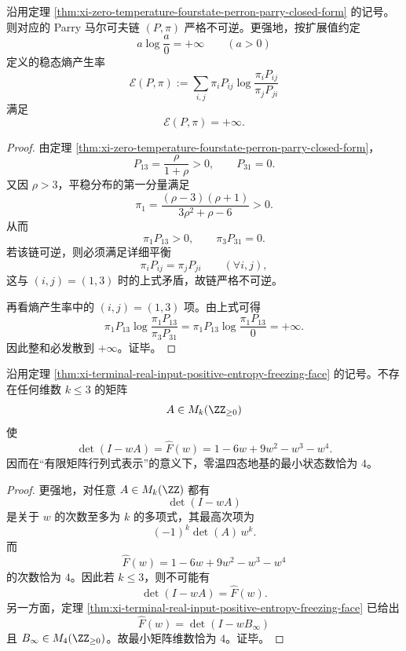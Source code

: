 \begin{theorem}\label{thm:xi-zero-temperature-parry-irreversible-infinite-entropy-production}
沿用定理 \ref{thm:xi-zero-temperature-fourstate-perron-parry-closed-form} 的记号。则对应的 Parry 马尔可夫链 \((P,\pi)\) 严格不可逆。更强地，按扩展值约定
\[
a\log\frac{a}{0}=+\infty
\qquad(a>0)
\]
定义的稳态熵产生率
\[
\mathcal E(P,\pi)
:=
\sum_{i,j}\pi_iP_{ij}\log\frac{\pi_iP_{ij}}{\pi_jP_{ji}}
\]
满足
\[
\mathcal E(P,\pi)=+\infty.
\]
\end{theorem}
\begin{proof}
由定理 \ref{thm:xi-zero-temperature-fourstate-perron-parry-closed-form}，
\[
P_{13}=\frac{\rho}{1+\rho}>0,
\qquad
P_{31}=0.
\]
又因 \(\rho>3\)，平稳分布的第一分量满足
\[
\pi_1=\frac{(\rho-3)(\rho+1)}{3\rho^2+\rho-6}>0.
\]
从而
\[
\pi_1P_{13}>0,
\qquad
\pi_3P_{31}=0.
\]
若该链可逆，则必须满足详细平衡
\[
\pi_iP_{ij}=\pi_jP_{ji}
\qquad(\forall i,j),
\]
这与 \((i,j)=(1,3)\) 时的上式矛盾，故链严格不可逆。

再看熵产生率中的 \((i,j)=(1,3)\) 项。由上式可得
\[
\pi_1P_{13}\log\frac{\pi_1P_{13}}{\pi_3P_{31}}
=
\pi_1P_{13}\log\frac{\pi_1P_{13}}{0}
=
+\infty.
\]
因此整和必发散到 \(+\infty\)。证毕。
\end{proof}

\begin{theorem}[零温四态地基的有限矩阵行列式表示极小性]\label{thm:xi-zero-temperature-fourstate-determinant-state-minimality}
沿用定理 \ref{thm:xi-terminal-real-input-positive-entropy-freezing-face} 的记号。不存在任何维数 \(k\le 3\) 的矩阵
\[
A\in M_k(\ZZ_{\ge 0})
\]
使
\[
\det(I-wA)=\widehat F(w)=1-6w+9w^2-w^3-w^4.
\]
因而在“有限矩阵行列式表示”的意义下，零温四态地基的最小状态数恰为 \(4\)。
\end{theorem}
\begin{proof}
更强地，对任意 \(A\in M_k(\ZZ)\) 都有
\[
\det(I-wA)
\]
是关于 \(w\) 的次数至多为 \(k\) 的多项式，其最高次项为
\[
(-1)^k\det(A)\,w^k.
\]
而
\[
\widehat F(w)=1-6w+9w^2-w^3-w^4
\]
的次数恰为 \(4\)。因此若 \(k\le 3\)，则不可能有
\[
\det(I-wA)=\widehat F(w).
\]
另一方面，定理 \ref{thm:xi-terminal-real-input-positive-entropy-freezing-face} 已给出
\[
\widehat F(w)=\det(I-wB_\infty)
\]
且 \(B_\infty\in M_4(\ZZ_{\ge 0})\)。故最小矩阵维数恰为 \(4\)。证毕。
\end{proof}
